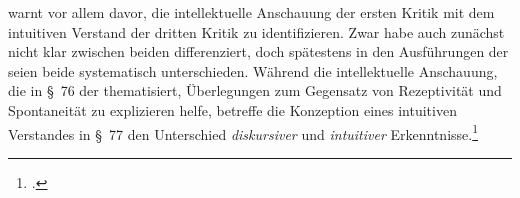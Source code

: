  warnt vor allem davor, die
intellektuelle Anschauung der ersten Kritik mit dem intuitiven Verstand der
dritten Kritik zu identifizieren. Zwar habe auch  zunächst
nicht klar zwischen beiden differenziert, doch spätestens in den Ausführungen der  seien beide systematisch unterschieden. Während die intellektuelle
Anschauung, die  in \S~76 der  thematisiert, Überlegungen zum Gegensatz von Rezeptivität und
Spontaneität zu explizieren helfe, betreffe die Konzeption
eines intuitiven Verstandes in \S~77 den Unterschied \emph{diskursiver} und
\emph{intuitiver} Erkenntnisse.\footnote{\cite[Vgl.][177]{Foerster:DieBedeutungvonSS7677deremphKritikderUrteilskraftfuerdieEntwicklungdernachkantischenPhilosophieTeil12002}.}


